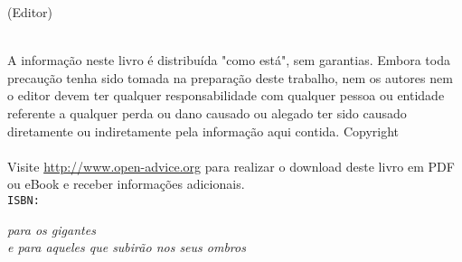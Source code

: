 \thispagestyle{empty}
\booktitle
\newpage
\newpage
\begin{titlepage}
\begin{flushright}
\bookeditor{} (Editor)\\
\vspace{10em}
{\Huge\bfseries\sffamily\booktitle}\\
\vspace{2em}
{\normalsize\sffamily\booksubtitle}
\end{flushright}
\end{titlepage}
\thispagestyle{empty}
A informação neste livro é distribuída "como está", sem garantias. Embora toda precaução tenha sido tomada na preparação deste trabalho, nem os autores nem o editor devem ter qualquer responsabilidade com qualquer pessoa ou entidade referente a qualquer perda ou dano causado ou alegado ter sido causado diretamente ou indiretamente pela informação aqui contida.%
\vfill
Copyright \textcopyright{} \bookyear{} \bookauthors\\
\newline
{}
\newline \\
Visite \url{http://www.open-advice.org} para realizar o download deste livro em PDF ou eBook e receber informações adicionais.
\newline \\
{\tt ISBN: \bookisbn}%
\newpage
\thispagestyle{empty}
\vspace*{2cm}
\begin{flushright}
{\Large\itshape para os gigantes\\e para aqueles que subirão nos seus ombros}\\
\end{flushright}
\newpage
\thispagestyle{empty}
\mbox{}
\newpage
